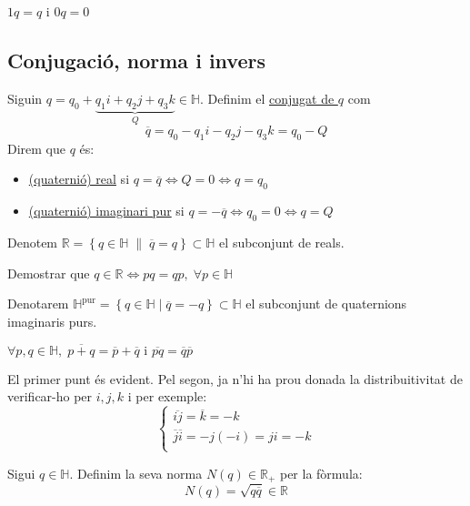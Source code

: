 \documentclass[a4paper,12pt]{article}
\begin{document}
	\begin{obs}
		$1q = q$ i $0q = 0$
	\end{obs}
	\subsection{Conjugació, norma i invers}
	\begin{definicio}
		Siguin $q = q_0 + \underbrace{q_1i + q_2j + q_3k}_{Q} \in \mathbb{H}$. Definim el \underline{conjugat de $q$} com
		\begin{displaymath}
			\overline{q} = q_0 - q_1i - q_2j - q_3k = q_0 - Q
		\end{displaymath}
		Direm que $q$ és:
		\begin{itemize}
			\item \underline{(quaternió) real} si $q = \overline{q} \iff Q=0 \iff q = q_0$
			\item \underline{(quaternió) imaginari pur} si $q = -\overline{q} \iff q_0 = 0 \iff q = Q$
		\end{itemize}
	\end{definicio}
	Denotem $\mathbb{R} = \left\{q \in \mathbb{H}\;\|\; \overline{q} = q \right\} \subset \mathbb{H}$ el subconjunt de reals.
	\begin{exercici}
		Demostrar que $q \in \mathbb{R} \iff pq = qp,\;\forall p \in \mathbb{H}$
	\end{exercici}
	Denotarem $\mathbb{H}^\text{pur} = \left\{q \in \mathbb{H}\;|\;\overline{q} = -q \right\} \subset \mathbb{H}$ el subconjunt de quaternions imaginaris purs.
	\begin{proposicio}
		$\forall p,q \in \mathbb{H},\; \overline{p+q} = \overline{p} + \overline{q}\text{ i }\overline{pq} = \overline{q}\overline{p}$
	\end{proposicio}
	\begin{demostracio}
        El primer punt és evident. Pel segon, ja n'hi ha prou donada la distribuitivitat de verificar-ho per $i, j, k$ i per exemple:
        \begin{displaymath}
        	\begin{cases}
	       		\overline{ij} = \overline{k} = -k\\
	         	\overline{j}\overline{i} = -j(-i) = ji = -k\\
			\end{cases}
		\end{displaymath}
	\end{demostracio}
	\begin{definicio}
		Sigui $q \in \mathbb{H}$. Definim la seva norma $N(q) \in \mathbb{R}_+$ per la fòrmula:
		\begin{displaymath}
			N(q) = \sqrt{q\overline{q}} \in \mathbb{R}
		\end{displaymath}
	\end{definicio}
\end{document}
